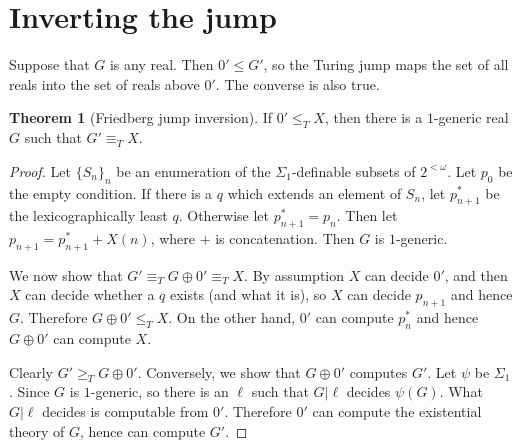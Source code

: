 \documentclass[12pt]{report}
\theoremstyle{definition}
\newtheorem{theorem}{Theorem}[chapter]
\begin{document}
\section{Inverting the jump}
Suppose that $G$ is any real. Then $0' \leq G'$, so the Turing jump maps the set of all reals into the set of reals above $0'$. The converse is also true.
\begin{theorem}[Friedberg jump inversion]
If $0' \leq_T X$, then there is a $1$-generic real $G$ such that $G' \equiv_T X$.
\end{theorem}
\begin{proof}
Let $\{S_n\}_n$ be an enumeration of the $\Sigma_1$-definable subsets of $2^{<\omega}$. Let $p_0$ be the empty condition.
If there is a $q$ which extends an element of $S_n$, let $p_{n+1}^*$ be the lexicographically least $q$. Otherwise let $p_{n+1}^* = p_n$. Then let $p_{n+1} = p_{n+1}^* + X(n)$, where $+$ is concatenation.
Then $G$ is $1$-generic.

We now show that $G' \equiv_T G \oplus 0' \equiv_T X$.
By assumption $X$ can decide $0'$, and then $X$ can decide whether a $q$ exists (and what it is), so $X$ can decide $p_{n+1}$ and hence $G$. Therefore $G \oplus 0' \leq_T X$.
On the other hand, $0'$ can compute $p_n^*$ and hence $G \oplus 0'$ can compute $X$.

Clearly $G' \geq_T G \oplus 0'$. Conversely, we show that $G \oplus 0'$ computes $G'$.
Let $\psi$ be $\Sigma_1$.
Since $G$ is $1$-generic, so there is an $\ell$ such that $G|\ell$ decides $\psi(G)$. What $G|\ell$ decides is computable from $0'$. Therefore $0'$ can compute the existential theory of $G$, hence can compute $G'$.
\end{proof}
\end{document}
